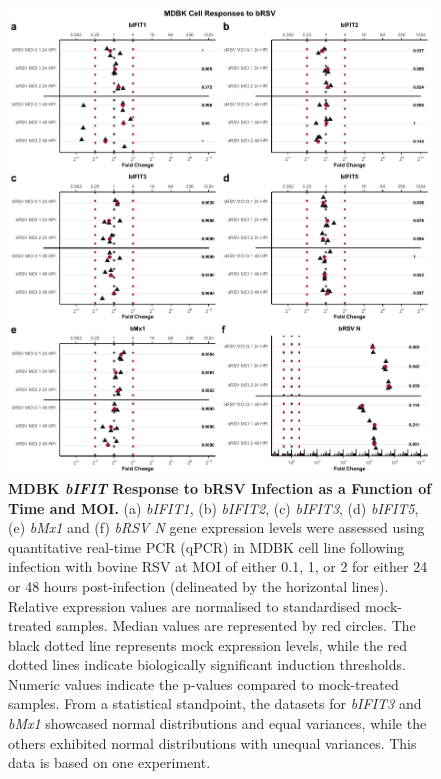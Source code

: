\begin{figure}
    \centering
    \includegraphics[width=1\linewidth]{07. Chapter 2/Figs/02. Induction/03. mdbk_brsv_timepoints.pdf}
    \caption[MDBK \textit{bIFIT} Response to bRSV Infection as a Function of Time and MOI.]{\textbf{MDBK \textit{bIFIT} Response to bRSV Infection as a Function of Time and MOI.} (a) \textit{bIFIT1}, (b) \textit{bIFIT2}, (c) \textit{bIFIT3}, (d) \textit{bIFIT5}, (e) \textit{bMx1} and (f) \textit{bRSV N} gene expression levels were assessed using quantitative real-time PCR (qPCR) in MDBK cell line following infection with bovine RSV at MOI of either 0.1, 1, or 2 for either 24 or 48 hours post-infection (delineated by the horizontal lines). Relative expression values are normalised to standardised mock-treated samples. Median values are represented by red circles. The black dotted line represents mock expression levels, while the red dotted lines indicate biologically significant induction thresholds. Numeric values indicate the p-values compared to mock-treated samples. From a statistical standpoint, the datasets for \textit{bIFIT3} and \textit{bMx1} showcased normal distributions and equal variances, while the others exhibited normal distributions with unequal variances. This data is based on one experiment.}
    \label{fig:MDBK responses to bRSV timepoints}
\end{figure}


